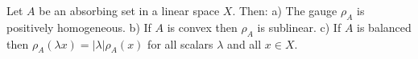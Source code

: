 Let $A$ be an absorbing set in a linear space $X$. Then: a) The gauge $\rho_A$ is positively homogeneous. b) If $A$ is convex then $\rho_A$ is sublinear. c) If $A$ is balanced then $\rho_A(\lambda x) = |\lambda|\rho_A(x)$ for all scalars $\lambda$ and all $x \in X$.